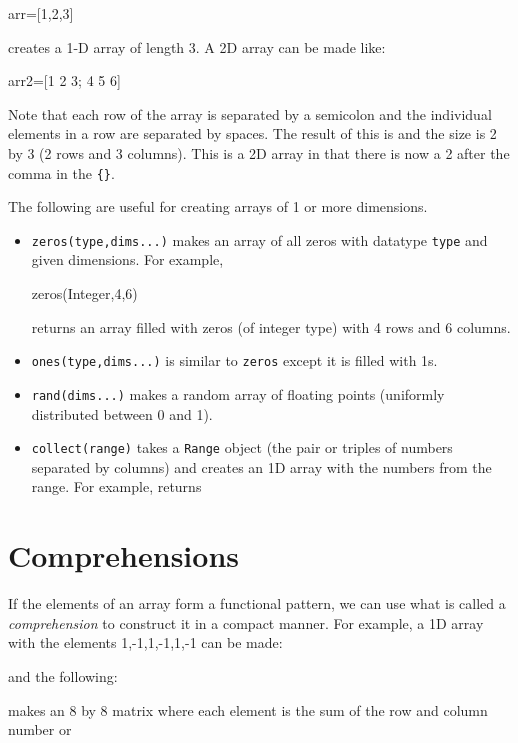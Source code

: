 \begin{jlblock}[array]
arr=[1,2,3]
\end{jlblock}
%
creates a 1-D array of length 3. A 2D array can
be made like:
%
\begin{jlblock}[array]
arr2=[1 2 3; 4 5 6]
\end{jlblock}
%
Note that each row of the array is separated by a semicolon and the individual elements in a row are separated by spaces. The result of this is  \printpythontex[verbatim]
%
and the size is 2 by 3 (2 rows and 3 columns).  This is a 2D array in that there is now a 2 after the comma in the \verb!{}!.

The following are useful for creating arrays of 1 or more dimensions.  
%
\begin{itemize}
\item \texttt{zeros(type,dims...)} makes an array of all zeros with datatype \texttt{type} and given dimensions. For example,
%
\begin{jlblock}
zeros(Integer,4,6)
\end{jlblock}
%
returns an array filled with zeros (of integer type) with 4 rows and 6 columns.

\item \texttt{ones(type,dims...)} is similar to \texttt{zeros} except it is filled with 1s.
\item \texttt{rand(dims...)} makes a random array of floating points (uniformly distributed between 0 and 1).
\item \verb!collect(range)! takes a \texttt{Range} object (the pair or triples of numbers separated by columns) and creates an 1D array with the numbers from the range.   For example,  returns
 \printpythontex[verbatim]
\end{itemize}


\hypertarget{comprehensions}{%
\section{Comprehensions}\label{comprehensions}}

If the elements of an array form a functional pattern, we can use what is called a
\emph{comprehension} to construct it in a compact manner. For example, a 1D array with the elements 1,-1,1,-1,1,-1 can be made:
%
\begin{jlblock}[array]
[(-1)^n for n=0:7]
\end{jlblock}
%
and the following:
%
\begin{jlblock}
[m+n for n=1:8,m=1:8]
\end{jlblock}
%
makes an 8 by 8 matrix where each element is the sum of the row and
column number or   \printpythontex[verbatim]
 
